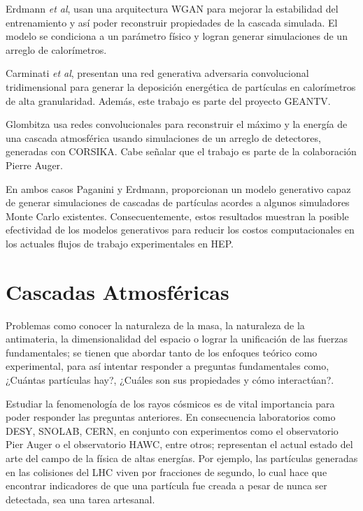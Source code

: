 Erdmann \emph{et al}, usan una arquitectura WGAN para mejorar la estabilidad del entrenamiento y así poder reconstruir propiedades de la cascada simulada. El modelo se condiciona a un parámetro físico y logran generar simulaciones de un arreglo de calorímetros.

Carminati \emph{et al}, presentan una red generativa adversaria convolucional tridimensional para generar la deposición energética de partículas en calorímetros de alta granularidad. Además, este trabajo es parte del proyecto GEANTV.

Glombitza usa redes convolucionales para reconstruir el máximo y la energía de una cascada atmosférica usando simulaciones de un arreglo de detectores, generadas con CORSIKA. Cabe señalar que el trabajo es parte de la colaboración Pierre Auger.

En ambos casos Paganini y Erdmann, proporcionan un modelo generativo capaz de generar simulaciones de cascadas de partículas acordes a algunos simuladores Monte Carlo existentes. Consecuentemente, estos resultados muestran la posible efectividad de los modelos generativos para reducir los costos computacionales en los actuales flujos de trabajo experimentales en HEP.  

\section{Cascadas Atmosféricas}

Problemas como conocer la naturaleza de la masa, la naturaleza de la antimateria, la dimensionalidad del espacio o lograr la unificación de las fuerzas fundamentales; se tienen que abordar tanto de los enfoques teórico como experimental, para así intentar responder a preguntas fundamentales como, ¿Cuántas partículas hay?, ¿Cuáles son sus propiedades y cómo interactúan?.

Estudiar la fenomenología de los rayos cósmicos es de vital importancia para poder responder las preguntas anteriores. En consecuencia laboratorios como DESY, SNOLAB, CERN, en conjunto con experimentos como el observatorio Pier Auger o el observatorio HAWC, entre otros; representan el actual estado del arte del campo de la física de altas energías. Por ejemplo, las partículas generadas en las colisiones del LHC viven por fracciones de segundo, lo cual hace que encontrar indicadores de que una partícula fue creada a pesar de nunca ser detectada, sea una tarea artesanal.


